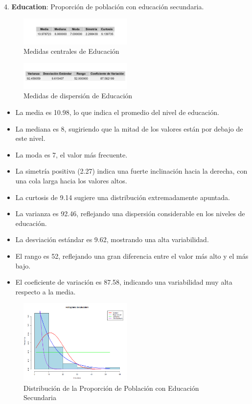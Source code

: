 \documentclass{article}
\begin{document}
4. \textbf{Education}: Proporción de población con educación secundaria.

   \begin{figure}[H]
    \centering
    \includegraphics[width=0.5\textwidth]{Swiss/Education_central.png}
    \caption{Medidas centrales de Educación}
\end{figure}

\begin{figure}[H]
    \centering
    \includegraphics[width=0.5\textwidth]{Swiss/Education_dispersion.png}
    \caption{Medidas de dispersión de Educación}
\end{figure}
   \begin{itemize}
       \item La media es 10.98, lo que indica el promedio del nivel de educación.
       \item La mediana es 8, sugiriendo que la mitad de los valores están por debajo de este nivel.
       \item La moda es 7, el valor más frecuente.
       \item La simetría positiva (2.27) indica una fuerte inclinación hacia la derecha, con una cola larga hacia los valores altos.
       \item La curtosis de 9.14 sugiere una distribución extremadamente apuntada.
       \item La varianza es 92.46, reflejando una dispersión considerable en los niveles de educación.
       \item La desviación estándar es 9.62, mostrando una alta variabilidad.
       \item El rango es 52, reflejando una gran diferencia entre el valor más alto y el más bajo.
       \item El coeficiente de variación es 87.58, indicando una variabilidad muy alta respecto a la media.
   \end{itemize}

   \begin{figure}[H]
    \centering
    \includegraphics[width=0.5\textwidth]{Histogramas/histogram_education.png}
    \caption{Distribución de la Proporción de Población con Educación Secundaria}
    \end{figure}
\end{document}
